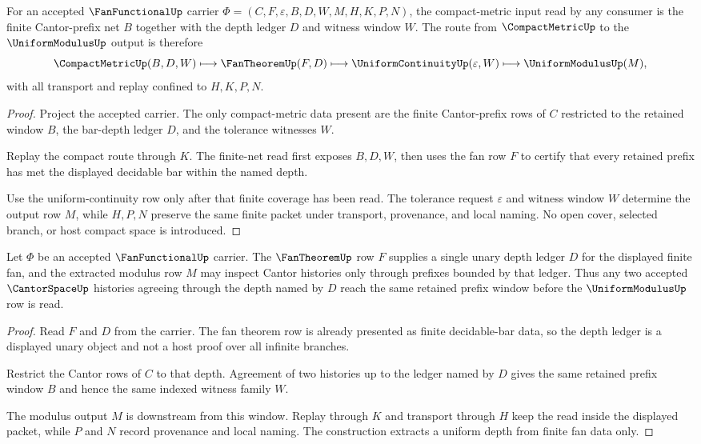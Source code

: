 \begin{theorem}
\label{thm:fanfunctional-compactmetric-finite-net-route}
For an accepted $\FanFunctionalUp$ carrier
$\Phi=(C,F,\varepsilon,B,D,W,M,H,K,P,N)$, the compact-metric input read by any
consumer is the finite Cantor-prefix net $B$ together with the depth ledger
$D$ and witness window $W$. The route from $\CompactMetricUp$ to the
$\UniformModulusUp$ output is therefore
$$
\CompactMetricUp(B,D,W) \longmapsto \FanTheoremUp(F,D)
\longmapsto \UniformContinuityUp(\varepsilon,W)
\longmapsto \UniformModulusUp(M),
$$
with all transport and replay confined to $H,K,P,N$.
\end{theorem}
\begin{proof}
Project the accepted carrier. The only compact-metric data present are the
finite Cantor-prefix rows of $C$ restricted to the retained window $B$, the
bar-depth ledger $D$, and the tolerance witnesses $W$.

Replay the compact route through $K$. The finite-net read first exposes
$B,D,W$, then uses the fan row $F$ to certify that every retained prefix has
met the displayed decidable bar within the named depth.

Use the uniform-continuity row only after that finite coverage has been read.
The tolerance request $\varepsilon$ and witness window $W$ determine the output
row $M$, while $H,P,N$ preserve the same finite packet under transport,
provenance, and local naming. No open cover, selected branch, or host compact
space is introduced.
\end{proof}

\begin{theorem}
\label{thm:fanfunctional-fan-theorem-uniform-depth}
Let $\Phi$ be an accepted $\FanFunctionalUp$ carrier. The $\FanTheoremUp$ row
$F$ supplies a single unary depth ledger $D$ for the displayed finite fan, and
the extracted modulus row $M$ may inspect Cantor histories only through
prefixes bounded by that ledger. Thus any two accepted $\CantorSpaceUp$
histories agreeing through the depth named by $D$ reach the same retained
prefix window before the $\UniformModulusUp$ row is read.
\end{theorem}
\begin{proof}
Read $F$ and $D$ from the carrier. The fan theorem row is already presented as
finite decidable-bar data, so the depth ledger is a displayed unary object and
not a host proof over all infinite branches.

Restrict the Cantor rows of $C$ to that depth. Agreement of two histories up
to the ledger named by $D$ gives the same retained prefix window $B$ and hence
the same indexed witness family $W$.

The modulus output $M$ is downstream from this window. Replay through $K$ and
transport through $H$ keep the read inside the displayed packet, while $P$ and
$N$ record provenance and local naming. The construction extracts a uniform
depth from finite fan data only.
\end{proof}

